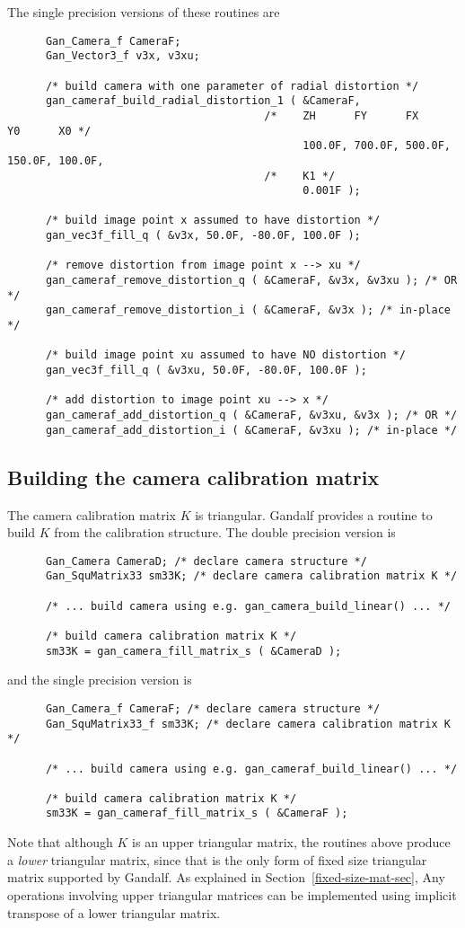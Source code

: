 The single precision versions of these routines are
\begin{verbatim}
      Gan_Camera_f CameraF;
      Gan_Vector3_f v3x, v3xu;

      /* build camera with one parameter of radial distortion */
      gan_cameraf_build_radial_distortion_1 ( &CameraF,
                                        /*    ZH      FY      FX      Y0      X0 */
                                              100.0F, 700.0F, 500.0F, 150.0F, 100.0F,
                                        /*    K1 */
                                              0.001F );

      /* build image point x assumed to have distortion */
      gan_vec3f_fill_q ( &v3x, 50.0F, -80.0F, 100.0F );

      /* remove distortion from image point x --> xu */
      gan_cameraf_remove_distortion_q ( &CameraF, &v3x, &v3xu ); /* OR */
      gan_cameraf_remove_distortion_i ( &CameraF, &v3x ); /* in-place */

      /* build image point xu assumed to have NO distortion */
      gan_vec3f_fill_q ( &v3xu, 50.0F, -80.0F, 100.0F );

      /* add distortion to image point xu --> x */
      gan_cameraf_add_distortion_q ( &CameraF, &v3xu, &v3x ); /* OR */
      gan_cameraf_add_distortion_i ( &CameraF, &v3xu ); /* in-place */
\end{verbatim}

\subsection{Building the camera calibration matrix}
The camera calibration matrix $K$ is triangular. Gandalf provides a
routine to build $K$ from the calibration structure. The double precision
version is
\begin{verbatim}
      Gan_Camera CameraD; /* declare camera structure */
      Gan_SquMatrix33 sm33K; /* declare camera calibration matrix K */

      /* ... build camera using e.g. gan_camera_build_linear() ... */

      /* build camera calibration matrix K */
      sm33K = gan_camera_fill_matrix_s ( &CameraD );
\end{verbatim}
and the single precision version is
\begin{verbatim}
      Gan_Camera_f CameraF; /* declare camera structure */
      Gan_SquMatrix33_f sm33K; /* declare camera calibration matrix K */

      /* ... build camera using e.g. gan_cameraf_build_linear() ... */

      /* build camera calibration matrix K */
      sm33K = gan_cameraf_fill_matrix_s ( &CameraF );
\end{verbatim}
Note that although $K$ is an upper triangular matrix, the routines above
produce a {\em lower} triangular matrix, since that is the only form of
fixed size triangular matrix supported by Gandalf. As explained in
Section~\ref{fixed-size-mat-sec}, Any operations involving upper triangular
matrices can be implemented using implicit transpose of a lower triangular
matrix.

